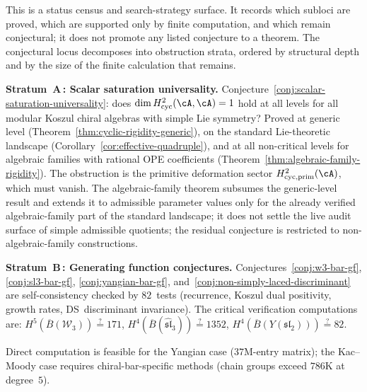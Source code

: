 \begin{remark}
\label{rem:conjecture-attack-strategies}
This is a status census and search-strategy surface. It records which
subloci are proved, which are supported only by finite computation, and
which remain conjectural; it does not promote any listed conjecture to
a theorem. The conjectural locus decomposes into obstruction strata,
ordered by structural depth and by the size of the finite calculation
that remains.

\smallskip\noindent
\textbf{Stratum~A\,: Scalar saturation universality.}
Conjecture~\ref{conj:scalar-saturation-universality}: does
$\dim H^2_{\mathrm{cyc}}(\cA,\cA) = 1$ hold at all levels for all
modular Koszul chiral algebras with simple Lie symmetry?
Proved at generic level
(Theorem~\ref{thm:cyclic-rigidity-generic}), on the standard
Lie-theoretic landscape
(Corollary~\ref{cor:effective-quadruple}),
and at all non-critical levels for algebraic families with
rational OPE coefficients
(Theorem~\ref{thm:algebraic-family-rigidity}).
The obstruction is the primitive deformation sector
$H^2_{\mathrm{cyc,prim}}(\cA)$, which must vanish.
The algebraic-family theorem subsumes the generic-level result
and extends it to admissible parameter values only for the
already verified algebraic-family part of the standard landscape;
it does not settle the live audit surface of simple admissible
quotients;
the residual conjecture is restricted to non-algebraic-family
constructions.

\smallskip\noindent
\textbf{Stratum~B\,: Generating function conjectures.}
Conjectures~\ref{conj:w3-bar-gf}, \ref{conj:sl3-bar-gf},
\ref{conj:yangian-bar-gf}, and~\ref{conj:non-simply-laced-discriminant}
are self-consistency checked by $82$~tests
(recurrence, Koszul dual positivity, growth rates, DS~discriminant
invariance). The critical verification computations are:
$H^5(\overline{B}(\mathcal{W}_3)) \stackrel{?}{=} 171$,
$H^4(\overline{B}(\widehat{\mathfrak{sl}}_3)) \stackrel{?}{=} 1352$,
$H^4(\overline{B}(Y(\mathfrak{sl}_2))) \stackrel{?}{=} 82$.

Direct computation is feasible for the Yangian case ($37$M-entry
matrix); the Kac--Moody case requires chiral-bar-specific methods
(chain groups exceed $786$K at degree~$5$).


\end{remark}
